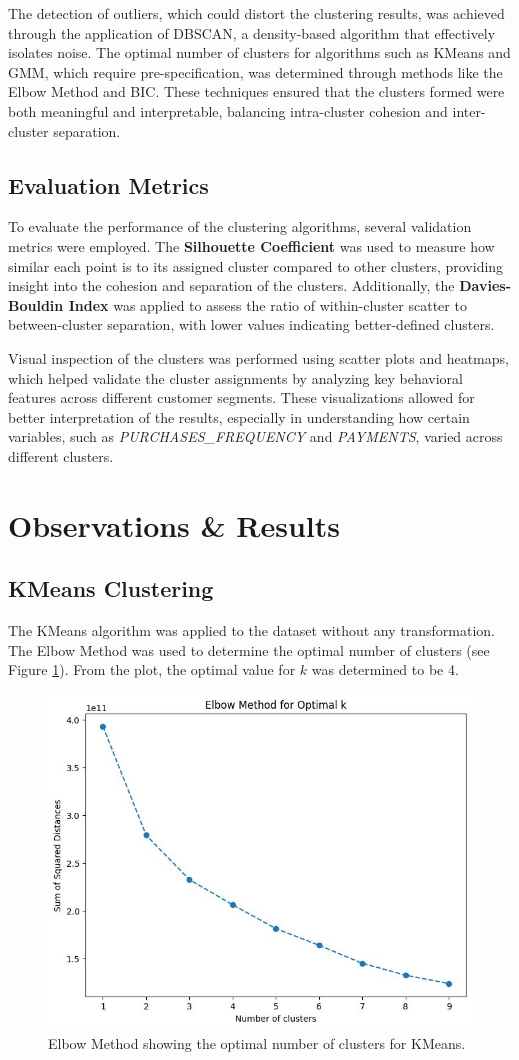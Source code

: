 \documentclass[runningheads,a4paper]{llncs}
\begin{document}
The detection of outliers, which could distort the clustering results, was achieved through the application of DBSCAN, a density-based algorithm that effectively isolates noise. The optimal number of clusters for algorithms such as KMeans and GMM, which require pre-specification, was determined through methods like the Elbow Method and BIC. These techniques ensured that the clusters formed were both meaningful and interpretable, balancing intra-cluster cohesion and inter-cluster separation.

\subsection{Evaluation Metrics}

To evaluate the performance of the clustering algorithms, several validation metrics were employed. The \textbf{Silhouette Coefficient} was used to measure how similar each point is to its assigned cluster compared to other clusters, providing insight into the cohesion and separation of the clusters. Additionally, the \textbf{Davies-Bouldin Index} was applied to assess the ratio of within-cluster scatter to between-cluster separation, with lower values indicating better-defined clusters.

Visual inspection of the clusters was performed using scatter plots and heatmaps, which helped validate the cluster assignments by analyzing key behavioral features across different customer segments. These visualizations allowed for better interpretation of the results, especially in understanding how certain variables, such as \textit{PURCHASES\_FREQUENCY} and \textit{PAYMENTS}, varied across different clusters.

\section{Observations \& Results}

\subsection{KMeans Clustering}

The KMeans algorithm was applied to the dataset without any transformation. The Elbow Method was used to determine the optimal number of clusters (see Figure \ref{fig:elbow_curve}). From the plot, the optimal value for \(k\) was determined to be 4.

\begin{figure}[h]
    \centering
    \includegraphics[width=0.4\linewidth]{elbow.jpeg} %
    \caption{Elbow Method showing the optimal number of clusters for KMeans.}
    \label{fig:elbow_curve}
\end{figure}
\end{document}
